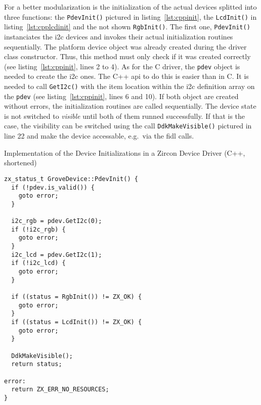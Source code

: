 For a better modularization is the initialization of the actual devices splitted into three functions: the \texttt{PdevInit()} pictured in listing~\ref{lst:cppinit}, the \texttt{LcdInit()} in listing~\ref{lst:cpplcdinit} and the not shown \texttt{RgbInit()}.
The first one, \texttt{PdevInit()} instanciates the \ac{i2c} devices and invokes their actual initialization routines sequentially.
The platform device object was already created during the driver class constructor.
Thus, this method must only check if it was created correctly (see listing~\ref{lst:cppinit}, lines 2 to 4).
As for the C driver, the \texttt{pdev} object is needed to create the \ac{i2c} ones.
The C++ \ac{api} to do this is easier than in C.
It is needed to call \texttt{GetI2c()} with the item location within the \ac{i2c} definition array on the \texttt{pdev} (see listing~\ref{lst:cppinit}, lines 6 and 10).
If both object are created without errors, the initialization routines are called sequentially.
The device state is not switched to \textit{visible} until both of them runned successfully.
If that is the case, the visibility can be switched using the call \texttt{DdkMakeVisible()} pictured in line 22 and make the device accessable, e.g.\ via the \ac{fidl} calls.

\begin{listing} [H]
    \caption{Implementation of the Device Initializations in a Zircon Device Driver (C++, shortened)}
\label{lst:cppinit}
\begin{verbatim}
zx_status_t GroveDevice::PdevInit() {
  if (!pdev.is_valid()) {
    goto error;
  }

  i2c_rgb = pdev.GetI2c(0);
  if (!i2c_rgb) {
    goto error;
  }
  i2c_lcd = pdev.GetI2c(1);
  if (!i2c_lcd) {
    goto error;
  }

  if ((status = RgbInit()) != ZX_OK) {
    goto error;
  }
  if ((status = LcdInit()) != ZX_OK) {
    goto error;
  }

  DdkMakeVisible();
  return status;

error:
  return ZX_ERR_NO_RESOURCES;
}
\end{verbatim}
\end{listing}

